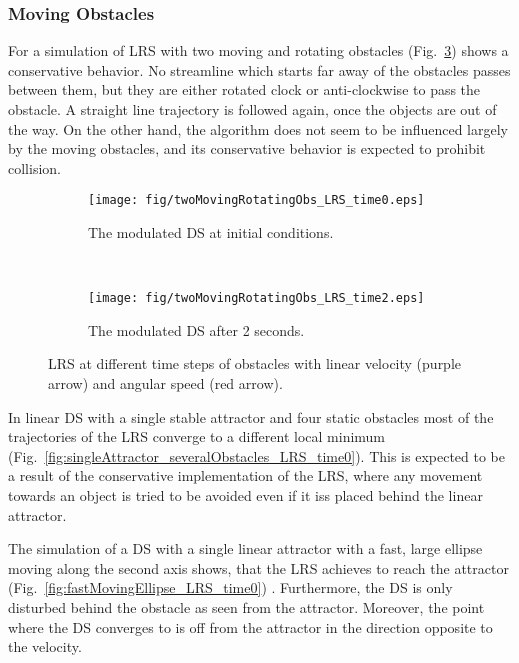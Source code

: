 \subsubsection{Moving Obstacles}
For a simulation of LRS with two moving and rotating obstacles (Fig.~\ref{fig:twoMovingRotatingObs_LRS}) shows a conservative behavior. No streamline which starts far away of the obstacles passes between them, but they  are either rotated clock or anti-clockwise to pass the obstacle. A straight line trajectory is followed again, once the objects are out of the way. On the other hand, the algorithm does not seem to be influenced largely by the moving obstacles, and its conservative behavior is expected to prohibit collision.
\begin{figure}[tb]\centering
\begin{subfigure}{.48\columnwidth} %
\centering
\texttt{[image: fig/twoMovingRotatingObs\_LRS\_time0.eps]}
\caption{The modulated DS at initial conditions.}
\label{fig:twoMovingRotatingObs_LRS_time0}
\end{subfigure}\,\, %
\begin{subfigure}{.48\columnwidth} %
\centering
\texttt{[image: fig/twoMovingRotatingObs\_LRS\_time2.eps]}
\caption{The modulated DS after 2 seconds.}
\label{fig:twoMovingRotatingObs_LRS_time2}
\end{subfigure}
\caption{LRS at different time steps of obstacles with linear velocity (purple arrow) and angular speed (red arrow). }
\label{fig:twoMovingRotatingObs_LRS}
\end{figure}

In linear DS with a single stable attractor and four static obstacles most of the trajectories of the LRS converge to a different local minimum  (Fig.~\ref{fig:singleAttractor_severalObstacles_LRS_time0}). This is expected to be a result of the conservative implementation of the LRS, where any movement towards an object is tried to be avoided even if it iss placed behind the linear attractor.

The simulation of a DS with a single linear attractor with a fast, large ellipse moving along the second axis shows, that the LRS achieves to reach the attractor (Fig.~\ref{fig:fastMovingEllipse_LRS_time0}) . Furthermore, the DS is only disturbed behind the obstacle as seen from the attractor.  Moreover, the point where the DS converges to is off from the attractor in the direction opposite to the velocity.

